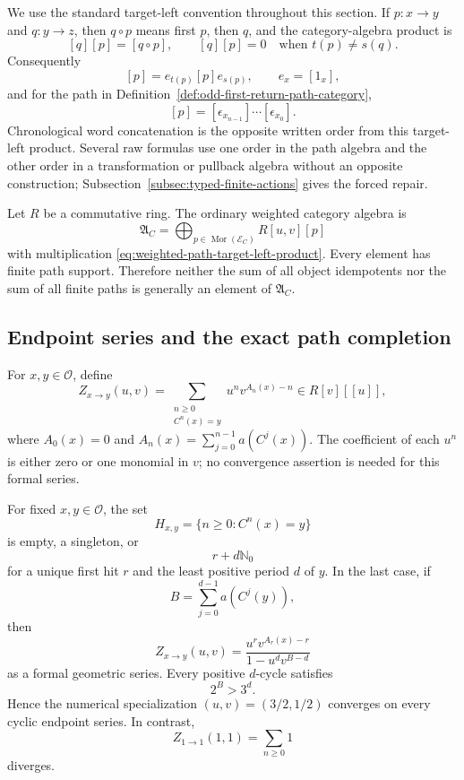 We use the standard target-left convention throughout this section.  If
$p:x\to y$ and $q:y\to z$, then $q\circ p$ means first $p$, then $q$, and
the category-algebra product is
\begin{equation}
\label{eq:weighted-path-target-left-product}
 [q][p]=[q\circ p],
 \qquad
 [q][p]=0\quad\text{when }t(p)\ne s(q).
\end{equation}
Consequently
\[
 [p]=e_{t(p)}[p]e_{s(p)},
 \qquad e_x=[1_x],
\]
and for the path in Definition~\ref{def:odd-first-return-path-category},
\[
 [p]=[\epsilon_{x_{n-1}}]\cdots[\epsilon_{x_0}].
\]
Chronological word concatenation is the opposite written order from this
target-left product.  Several raw formulas use one order in the path algebra
and the other order in a transformation or pullback algebra without an
opposite construction; Subsection~\ref{subsec:typed-finite-actions} gives the
forced repair.

Let $R$ be a commutative ring.  The ordinary weighted category algebra is
\[
 \mathfrak A_C
   =\bigoplus_{p\in\operatorname{Mor}(\mathcal E_C)}R[u,v][p]
\]
with multiplication \eqref{eq:weighted-path-target-left-product}.  Every
element has finite path support.  Therefore neither the sum of all object
idempotents nor the sum of all finite paths is generally an element of
$\mathfrak A_C$.

\subsection{Endpoint series and the exact path completion}

For $x,y\in\mathcal O$, define
\begin{equation}
\label{eq:weighted-endpoint-series}
 Z_{x\to y}(u,v)
   =\sum_{\substack{n\geq0\\ C^n(x)=y}}
      u^n v^{A_n(x)-n}
   \in R[v][[u]],
\end{equation}
where $A_0(x)=0$ and
$A_n(x)=\sum_{j=0}^{n-1}a(C^j(x))$.  The coefficient of each $u^n$ is
either zero or one monomial in $v$; no convergence assertion is needed for
this formal series.

\begin{proposition}
\label{prop:weighted-endpoint-hit-times}
For fixed $x,y\in\mathcal O$, the set
\[
 H_{x,y}=\{n\geq0:C^n(x)=y\}
\]
is empty, a singleton, or
\[
 r+d\mathbb N_0
\]
for a unique first hit $r$ and the least positive period $d$ of $y$.  In the
last case, if
\[
 B=\sum_{j=0}^{d-1}a(C^j(y)),
\]
then
\begin{equation}
\label{eq:weighted-cyclic-endpoint-rational-form}
 Z_{x\to y}(u,v)
 =\frac{u^r v^{A_r(x)-r}}{1-u^d v^{B-d}}
\end{equation}
as a formal geometric series.  Every positive $d$-cycle satisfies
\begin{equation}
\label{eq:positive-cycle-weight-inequality}
 2^B>3^d.
\end{equation}
Hence the numerical specialization $(u,v)=(3/2,1/2)$ converges on every
cyclic endpoint series.  In contrast,
\[
 Z_{1\to1}(1,1)=\sum_{n\geq0}1
\]
diverges.
\end{proposition}

